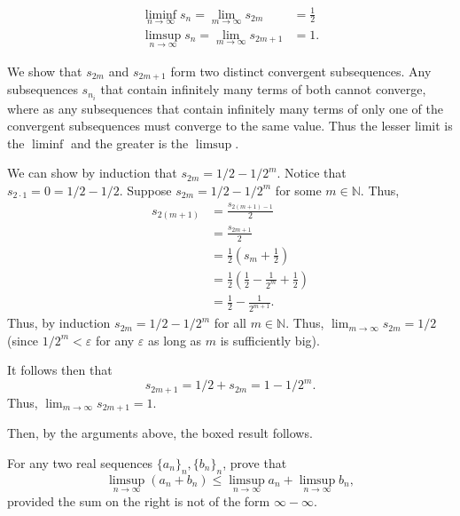 \documentclass[12 pt, letterpaper]{hmcpset}
\begin{document}
\begin{solution}
	\[
		\boxed{
			\begin{split}
				\liminf_{n \to \infty} s_n = \lim_{m \to \infty} s_{2m} & = \frac{1}{2} \\
				\limsup_{n \to \infty} s_{n} = \lim_{m \to \infty} s_{2m + 1} & = 1.
			\end{split}		
		}
	\]

	We show that $s_{2m}$ and $s_{2m + 1}$ form two distinct convergent subsequences. Any subsequences $s_{n_{i}}$ that contain infinitely many terms of both cannot converge, where as any subsequences that contain infinitely many terms of only one of the convergent subsequences must converge to the same value. Thus the lesser limit is the $\liminf$ and the greater is the $\limsup$.

	We can show by induction that $s_{2m} = 1/2 - 1/2^{m}$. Notice that $s_{2 \cdot 1} = 0 = 1/2 - 1/2$. Suppose $s_{2m} = 1/2 - 1/2^{m}$ for some $m \in \mathbb{N}$. Thus,
	\[
		\begin{split}
			s_{2(m + 1)} & = \frac{s_{2(m + 1) - 1}}{2} \\
				     & = \frac{s_{2m + 1}}{2} \\
				     & = \frac{1}{2} \left ( s_{m} + \frac{1}{2} \right ) \\
				     & = \frac{1}{2} \left ( \frac{1}{2} - \frac{1}{2^{m}} + \frac{1}{2} \right ) \\
				     & = \frac{1}{2} - \frac{1}{2^{m + 1}}.
		\end{split}
	\]
	Thus, by induction $s_{2m} = 1/2 - 1/2^{m}$ for all $m \in \mathbb{N}$.	Thus, $\lim_{m \to \infty} s_{2m} = 1/2$ (since $1/2^{m} < \varepsilon$ for any $\varepsilon$ as long as $m$ is sufficiently big).

	It follows then that
	\[
		s_{2m + 1} = 1/2 + s_{2m} = 1 - 1/2^{m}.
	\]
	Thus, $\lim_{m \to \infty} s_{2m + 1} = 1$.

	Then, by the arguments above, the boxed result follows.
\end{solution}

\pagebreak

\begin{problem}
	For any two real sequences $\{ a_{n} \}_{n}, \{ b_{n} \}_{n}$, prove that
	\[
		\limsup_{n \to \infty} (a_{n} + b_{n}) \le \limsup_{n \to \infty} a_{n} + \limsup_{n \to \infty} b_{n},	
	\]
	provided the sum on the right is not of the form $\infty - \infty$.
\end{problem}
\end{document}
